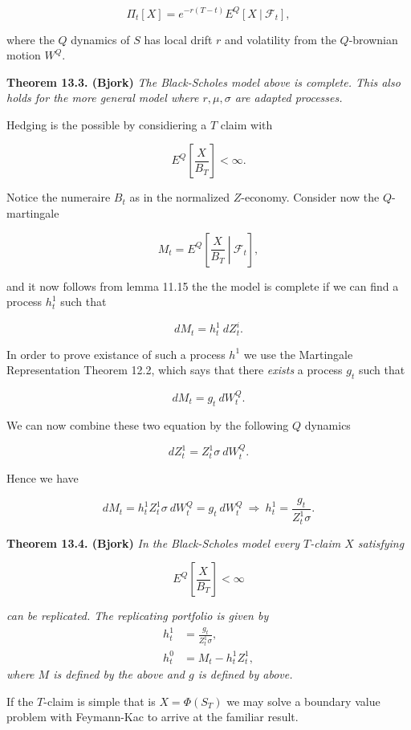 \documentclass[a4paper,12pt,openany]{book}
\begin{document}
\[
\Pi_t[X]=e^{-r(T-t)}E^Q[X\ \vert\ \mathcal{F}_t],\tag{13.7}
\]

where the \(Q\) dynamics of \(S\) has local drift \(r\) and volatility from the \(Q\)-brownian motion \(W^Q\).

\textbf{Theorem 13.3. (Bjork)} \emph{The Black-Scholes model above is complete. This also holds for the more general model where \(r,\mu,\sigma\) are adapted processes.}

Hedging is the possible by considiering a \(T\) claim with

\[
E^Q\left[\frac{X}{B_T}\right]<\infty.
\]

Notice the numeraire \(B_t\) as in the normalized \(Z\)-economy. Consider now the \(Q\)-martingale

\[
M_t=E^Q\left[\left. \frac{X}{B_T}\ \right\vert\ \mathcal{F}_t\right],\tag{13.9}
\]

and it now follows from lemma 11.15 the the model is complete if we can find a process \(h_t^1\) such that

\[
dM_t=h_t^1\ dZ_t^i.\tag{13.10}
\]

In order to prove existance of such a process \(h^1\) we use the Martingale Representation Theorem 12.2, which says that there \emph{exists} a process \(g_t\) such that

\[
dM_t=g_t\ dW_t^Q.\tag{13.11}
\]

We can now combine these two equation by the following \(Q\) dynamics

\[
dZ_t^1=Z_t^1\sigma\ dW_t^Q.\tag{13.12}
\]

Hence we have

\[
dM_t=h_t^1Z_t^1\sigma\ dW_t^Q=g_t\ dW_t^Q\ \Rightarrow\ h_t^1=\frac{g_t}{Z_t^1\sigma}.
\]

\textbf{Theorem 13.4. (Bjork)} \emph{In the Black-Scholes model every \(T\)-claim \(X\) satisfying}

\[
E^Q\left[\frac{X}{B_T}\right]<\infty
\]

\emph{can be replicated. The replicating portfolio is given by}
\begin{align*}
h_t^1&=\frac{g_t}{Z_t^1\sigma},\tag{13.13}\\
h_t^0&=M_t-h_t^1Z_t^1,\tag{13.14}
\end{align*}
\emph{where \(M\) is defined by the above and \(g\) is defined by above.}

If the \(T\)-claim is simple that is \(X=\Phi(S_T)\) we may solve a boundary value problem with Feymann-Kac to arrive at the familiar result.
\end{document}
